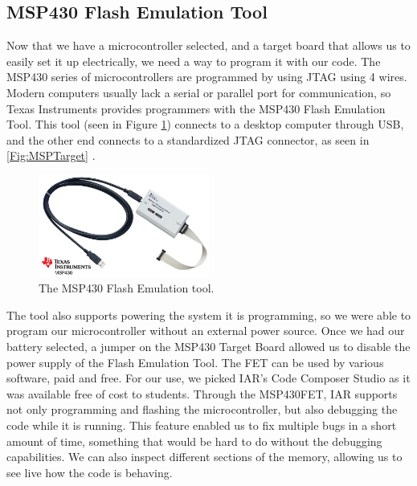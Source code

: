 \subsection{MSP430 Flash Emulation Tool}
\label{Sec:MSP430FET}
Now that we have a microcontroller selected, and a target board that allows us to easily set it up electrically, we need a way to program it with our code. The MSP430 series of microcontrollers are programmed by using JTAG using 4 wires. Modern computers usually lack a serial or parallel port for communication, so Texas Instruments provides programmers with the MSP430 Flash Emulation Tool. This tool (seen in Figure \ref{Fig:MSP430FET}) connects to a desktop computer through USB, and the other end connects to a standardized JTAG connector, as seen in \ref{Fig:MSPTarget} \cite{Web:MSPFETPAGE}. 
\begin{figure}
\begin{center}
\includegraphics[width=0.5\textwidth]{images/MSP430FETUIF.jpg}
\caption{The MSP430 Flash Emulation tool.}
\label{Fig:MSP430FET}
\end{center}
\end{figure}

The tool also supports powering the system it is programming, so we were able to program our microcontroller without an external power source. Once we had our battery selected, a jumper on the MSP430 Target Board allowed us to disable the power supply of the Flash Emulation Tool. The FET can be used by various software, paid and free. For our use, we picked IAR's Code Composer Studio as it was available free of cost to students. Through the MSP430FET, IAR supports not only programming and flashing the microcontroller, but also debugging the code while it is running. This feature enabled us to fix multiple bugs in a short amount of time, something that would be hard to do without the debugging capabilities. We can also inspect different sections of the memory, allowing us to see live how the code is behaving.


